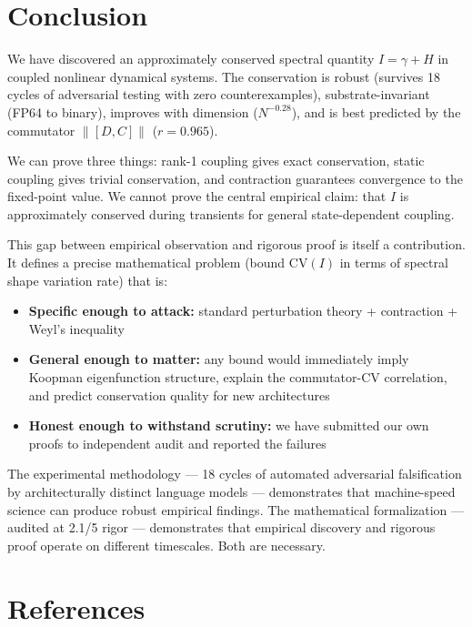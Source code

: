 \documentclass[11pt]{article}
\begin{document}
\section{Conclusion}

We have discovered an approximately conserved spectral quantity $I = \gamma + H$ in coupled nonlinear dynamical systems. The conservation is robust (survives 18 cycles of adversarial testing with zero counterexamples), substrate-invariant (FP64 to binary), improves with dimension ($N^{-0.28}$), and is best predicted by the commutator $\|[D,C]\|$ ($r = 0.965$).

We can prove three things: rank-1 coupling gives exact conservation, static coupling gives trivial conservation, and contraction guarantees convergence to the fixed-point value. We cannot prove the central empirical claim: that $I$ is approximately conserved during transients for general state-dependent coupling.

This gap between empirical observation and rigorous proof is itself a contribution. It defines a precise mathematical problem (bound $\mathrm{CV}(I)$ in terms of spectral shape variation rate) that is:
\begin{itemize}
  \item \textbf{Specific enough to attack:} standard perturbation theory + contraction + Weyl's inequality
  \item \textbf{General enough to matter:} any bound would immediately imply Koopman eigenfunction structure, explain the commutator-CV correlation, and predict conservation quality for new architectures
  \item \textbf{Honest enough to withstand scrutiny:} we have submitted our own proofs to independent audit and reported the failures
\end{itemize}

The experimental methodology --- 18 cycles of automated adversarial falsification by architecturally distinct language models --- demonstrates that machine-speed science can produce robust empirical findings. The mathematical formalization --- audited at 2.1/5 rigor --- demonstrates that empirical discovery and rigorous proof operate on different timescales. Both are necessary.

\section*{References}
\end{document}
